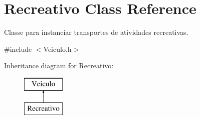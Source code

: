 \hypertarget{class_recreativo}{}\section{Recreativo Class Reference}
\label{class_recreativo}


Classe para instanciar transportes de atividades recreativas.  




{\ttfamily \#include $<$Veiculo.\+h$>$}

Inheritance diagram for Recreativo\+:\begin{figure}[H]
\begin{center}
\leavevmode
\includegraphics[height=2.000000cm]{class_recreativo}
\end{center}
\end{figure}
